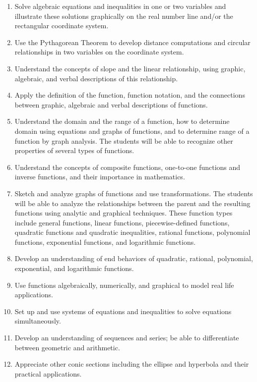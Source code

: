 \documentclass[11pt]{article}
\newenvironment{alphalist}{
\begin{enumerate}[label=(\arabic*),widest=107 ,leftmargin=25pt, itemsep=0pt]}
{\end{enumerate}}
\begin{document}
\begin{alphalist}

\item Solve algebraic equations and inequalities in one or two variables and illustrate these solutions graphically on the real number line and/or the rectangular coordinate system. 

\item Use the Pythagorean Theorem to develop distance computations and circular relationships in two variables on the coordinate system. 

\item   Understand the concepts of slope and the linear relationship, using graphic, algebraic, and verbal descriptions of this relationship. 

\item Apply the definition of the function, function notation, and the connections between graphic, algebraic and verbal descriptions of functions. 

\item  Understand the domain and the range of a function, how to determine domain using equations and graphs of functions, and to determine range of a function by graph analysis. The students will be able to recognize other properties of several types of functions. 

\item   Understand the concepts of composite functions, one-to-one functions and inverse functions, and their importance in mathematics. 

\item  Sketch and analyze graphs of functions and use transformations.  The students will be able to analyze the relationships between the parent and the resulting functions using analytic and graphical techniques. These function types include general functions, linear functions, piecewise-defined functions, quadratic functions and quadratic inequalities, rational functions, polynomial functions, exponential functions, and logarithmic functions. 

\item   Develop an understanding of end behaviors of quadratic, rational, polynomial, exponential, and logarithmic functions. 

\item   Use functions algebraically, numerically, and graphical to model real life applications. 

\item   Set up and use systems of equations and inequalities to solve equations simultaneously.  

\item   Develop an understanding of sequences and series; be able to differentiate between geometric and arithmetic.  

\item   Appreciate other conic sections including the ellipse and hyperbola and their practical applications.  

\end{alphalist}
\end{document}
